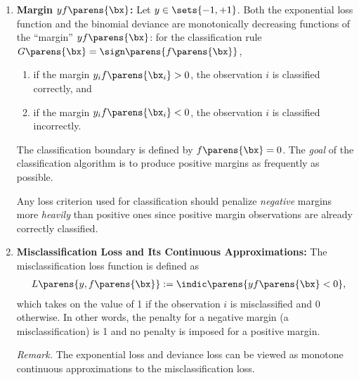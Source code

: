 \documentclass[12pt]{article}
\begin{document}
\begin{enumerate}[label=\textbf{\arabic*.}]

	\item \textbf{Margin $yf\parens{\bx}$:} Let $y \in \sets{-1, +1}$. Both the exponential loss function and the binomial deviance are monotonically decreasing functions of the ``margin'' $yf\parens{\bx}$: for the classification rule $G \parens{\bx} = \sign \parens{f \parens{\bx}}$, 
	\begin{enumerate}
		\item if the margin $y_i f \parens{\bx_i} > 0$, the observation $i$ is classified correctly, and 
		\item if the margin $y_i f \parens{\bx_i} < 0$, the observation $i$ is classified incorrectly. 
	\end{enumerate}
	The classification boundary is defined by $f \parens{\bx} = 0$. The \textit{goal} of the classification algorithm is to produce positive margins as frequently as possible. 
	
	Any loss criterion used for classification should penalize \textit{negative} margins more \textit{heavily} than positive ones since positive margin observations are already correctly classified. 
	
	\item \textbf{Misclassification Loss and Its Continuous Approximations:} The misclassification loss function is defined as 
	\begin{align*}
	  	L \parens{y, f \parens{\bx}} := \indic \parens{y f \parens{\bx} < 0}, 
	\end{align*}
	which takes on the value of 1 if the observation $i$ is misclassified and 0 otherwise. In other words, the penalty for a negative margin (a misclassification) is 1 and no penalty is imposed for a positive margin. 
	
	\textit{Remark.} The exponential loss and deviance loss can be viewed as monotone continuous approximations to the misclassification loss. 
	

\end{enumerate}
\end{document}

